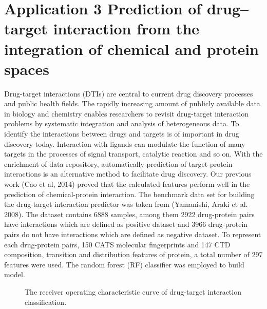 \documentclass[letterpaper,10pt,english]{sphinxmanual}
\begin{document}
\section{Application 3 Prediction of drug–target interaction from the integration of chemical and protein spaces}
\label{application:application-3-prediction-of-drugtarget-interaction-from-the-integration-of-chemical-and-protein-spaces}
Drug-target interactions (DTIs) are central to current drug discovery processes and public health fields. The rapidly increasing amount of publicly available data in biology and chemistry enables researchers to revisit drug-target interaction problems by systematic integration and analysis of heterogeneous data. To identify the interactions between drugs and targets is of important in drug discovery today. Interaction with ligands can modulate the function of many targets in the processes of signal transport, catalytic reaction and so on. With the enrichment of data repository, automatically prediction of target-protein interactions is an alternative method to facilitate drug discovery. Our previous work (Cao et al, 2014) proved that the calculated features perform well in the prediction of chemical-protein interaction. The benchmark data set for building the drug-target interaction predictor was taken from (Yamanishi, Araki et al. 2008). The dataset contains 6888 samples, among them 2922 drug-protein pairs have interactions which are defined as positive dataset and 3966 drug-protein pairs do not have interactions which are defined as negative dataset. To represent each drug-protein pairs, 150 CATS molecular fingerprints and 147 CTD composition, transition and distribution features of protein, a total number of 297 features were used. The random forest (RF) classifier was employed to build model.
\begin{figure}[htbp]
\centering
\capstart

\noindent{}
\caption{The receiver operating characteristic curve of drug-target interaction classification.}\label{application:id4}\end{figure}
\end{document}
